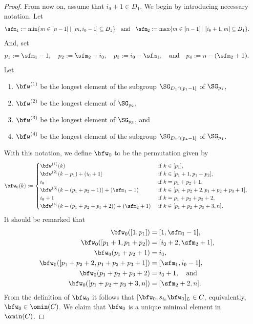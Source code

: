 \documentclass[12pt, reqno]{amsart}
\theoremstyle{definition}
\numberwithin{equation}{section} \numberwithin{figure}{section}
\numberwithin{table}{section}
\begin{document}
\begin{proof}
From now on, assume that $i_0 + 1 \in D_1$.
We begin by introducing necessary notation.
Let
\[
\sfm_1 := \min\{m \in [n - 1] \mid [m, i_0 - 1] \subseteq D_1 \}
\quad \text{and} \quad
\sfm_2 := \max\{m  \in [n - 1] \mid [i_0 + 1, m] \subseteq D_1 \}.
\]
And, set
\[
p_1 := \sfm_1 - 1,
\quad
p_2 := \sfm_2 - i_0,
\quad
p_3 := i_0 - \sfm_1, 
\quad \text{and} \quad
p_4 := n - (\sfm_2 + 1).
\]
Let
\begin{enumerate}[label = $\bullet$]
\item 
$\bfw^{(1)}$ be the longest element of the subgroup $\SG_{D_1 \cap [p_1 - 1]}$ of $\SG_{p_1}$,
\item 
$\bfw^{(2)}$ be the longest element of $\SG_{p_2}$,
\item
$\bfw^{(3)}$ be the longest element of $\SG_{p_3}$, and
\item 
$\bfw^{(4)}$ be the longest element of the subgroup $\SG_{D_1 \cap [p_4 -1]}$ of $\SG_{p_4}$.
\end{enumerate}
With this notation, we define $\bfw_0$ to be the permutation given by
\[
\bfw_0(k) := \begin{cases}
\bfw^{(1)}(k) 
& \text{
if $k \in [p_1]$,
} \\
\bfw^{(2)}(k - p_1) + (i_0 + 1)
& \text{
if $k \in [p_1 +1, p_1 + p_2]$,
} \\
i_0
& \text{
if $k = p_1 + p_2 + 1$,
} \\
\bfw^{(3)}(k - (p_1 + p_2 + 1)) + (\sfm_1 - 1)
& \text{
if $k \in [p_1 + p_2 + 2, p_1 + p_2 + p_3 + 1]$,
} \\
i_0 + 1 
& \text{
if $k = p_1 + p_2 + p_3 + 2$,
} \\
\bfw^{(4)}(k - (p_1 + p_2 + p_3 + 2)) + (\sfm_2 + 1)
& \text{
if $k \in [p_1 + p_2 + p_3 + 3, n]$.
}
\end{cases}
\]
It should be remarked that 
\begin{align*}
\bfw_0([1,p_1]) &= [1,\sfm_1-1], 
\\
\bfw_0([p_1+1,p_1+p_2]) & = [i_0+2,\sfm_2+1], 
\\ 
\bfw_0(p_1+p_2+1) &= i_0,
\\ \bfw_0([p_1+p_2+2,p_1+p_2+p_3+1]) &= [\sfm_1, i_0-1], 
\\
\bfw_0(p_1+p_2+p_3+2) &= i_0+1,
\quad  \text{and} \\
\bfw_0([p_1+p_2+p_3+3,n]) &= [\sfm_2+2, n].
\end{align*}
From the definition of $\bfw_0$ it follows that $[\bfw_0, s_{i_0} \bfw_0]_L \in C$, equivalently, $\bfw_0 \in \omin(C)$.
We claim that $\bfw_0$ is a unique minimal element in $\omin(C)$.

\end{proof}
\end{document}

